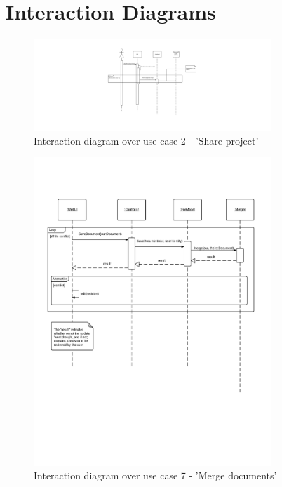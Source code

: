 \section{Interaction Diagrams}
\label{sec:interaction-diagram-appendix}

\begin{figure}[htb]
    \centering
    \includegraphics[width=0.8\textwidth]{Software_design/graphics/usecase2.png}
    \caption{Interaction diagram over use case 2 - 'Share project'}
    \label{fig:uc2-interaction-diagram}
\end{figure}

\begin{figure}[hbt]
    \centering
    \includegraphics[width=0.8\textwidth]{Software_design/graphics/usecase7.png}
    \caption{Interaction diagram over use case 7 - 'Merge documents'}
    \label{fig:uc7-interaction-diagram}
\end{figure}

